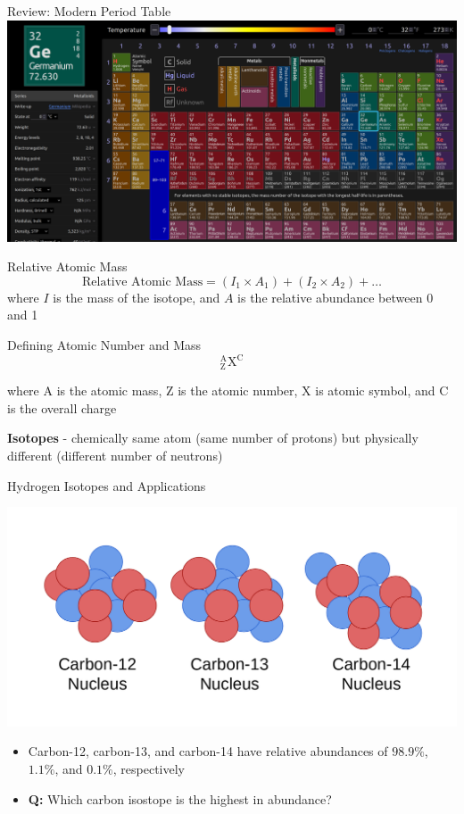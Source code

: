 \documentclass[11pt]{beamer}
\begin{document}
\begin{frame}{Review: Modern Period Table}
  \centering
  \includegraphics[width=\linewidth]{ptable}
\end{frame}

\begin{frame}{Relative Atomic Mass}
  \begin{equation}
    \text{Relative Atomic Mass} = (I_1\times A_1) + (I_2\times A_2) + \dots
  \end{equation}
  where $I$ is the mass of the isotope, and $A$ is the
  relative abundance between 0 and 1
\end{frame}

\begin{frame}{Defining Atomic Number and Mass}
  \begin{equation}
    ^\text{A}_\text{Z}\text{X}^\text{C}
  \end{equation}

  where A is the atomic mass, Z is the atomic number, X is atomic
  symbol, and C is the overall charge

  \textbf{Isotopes} - chemically same atom (same number of protons)
  but physically different (different number of neutrons)
\end{frame}

\begin{frame}{Hydrogen Isotopes and Applications}
  \begin{center}
    \includegraphics[width=0.75\linewidth]{carbon_isotopes}
  \end{center}

  \begin{itemize}
  \item Carbon-12, carbon-13, and carbon-14
    have relative abundances of $98.9\%$, $1.1\%$, and $0.1\%$,
    respectively
  \item \textbf{Q:} Which carbon isostope is the highest in abundance?
  \end{itemize}
\end{frame}
\end{document}
